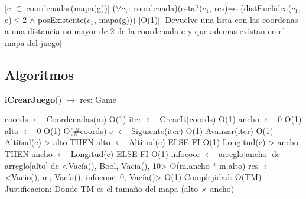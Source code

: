 [c $\in$ coordenadas(mapa(g))]
{($\forall c_1$: coordenada)(esta?($c_1$, res)$\Rightarrow_{\mathrm{\scriptscriptstyle{L}}}$(distEuclidea($c_1$, c)$\leq$2  $\wedge$ posExistente($c_1$, mapa(g)))}
[O(1)]
[Devuelve una lista con las coordenas a una distancia no mayor de 2 de la coordenada c y que ademas existan en el mapa del juego]

\subsection{Algoritmos}

\begin{Algoritmos}



\begin{algorithm}[H]{\textbf{iCrearJuego}() $\to$ res: Game}
	\begin{algorithmic}[1]
		\State coords $\gets$ Coordenadas(m) \Comment O(1)
		\State iter $\gets$ CrearIt(coords) \Comment O(1)
		\State ancho $\gets$ 0 \Comment O(1)
		\State alto $\gets$ 0 \Comment O(1)
		 \Comment O($\#$coords)
			\State c $\gets$ Siguiente(iter) \Comment O(1)
			\State Avanzar(iter) \Comment O(1)
			\State \IF Altitud(c) > alto THEN alto $\gets$ Altitud(c) ELSE FI \Comment O(1)
			\State \IF Longitud(c) > ancho THEN ancho $\gets$ Longitud(c) ELSE FI \Comment O(1)
		\EndWhile
		\State infocoor $\gets$ arreglo[ancho] de arreglo[alto] de <Vac\'ia(), Bool, Vac\'ia(), 10> \Comment O(m.ancho * m.alto)
		\State res $\gets$ <Vacio(), m, Vac\'ia(), infocoor, 0, Vac\'ia()> \Comment O(1)
		\medskip
		\Statex \underline{Complejidad:} O(TM)
		\Statex \underline{Justificacion:} Donde TM es el tama\~no del mapa (alto $\times$ ancho)
	\end{algorithmic}
\end{algorithm}



\end{Algoritmos}
